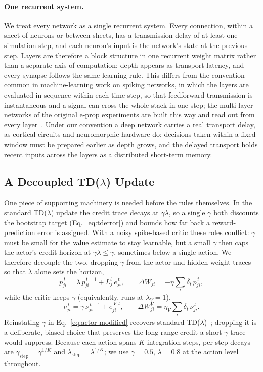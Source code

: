 \documentclass[10pt,twocolumn]{article}
\begin{document}
\paragraph{One recurrent system.} We treat every network as a single recurrent system.
Every connection, within a sheet of neurons or between sheets, has a transmission
delay of at least one simulation step, and each neuron's input is the network's state
at the previous step. Layers are therefore a block structure in one recurrent weight
matrix rather than a separate axis of computation: depth appears as transport latency,
and every synapse follows the same learning rule. This differs from the convention
common in machine-learning work on spiking networks, in which the layers are evaluated
in sequence within each time step, so that feedforward transmission is instantaneous
and a signal can cross the whole stack in one step; the multi-layer networks of the
original e-prop experiments are built this way and read out from every
layer~\citep{eprop2020}. Under our convention a deep network carries a real transport
delay, as cortical circuits and neuromorphic hardware do: decisions taken within a
fixed window must be prepared earlier as depth grows, and the delayed transport holds
recent inputs across the layers as a distributed short-term memory.

\subsection{A Decoupled TD($\lambda$) Update}
\label{sec:tdlambda}

One piece of supporting machinery is needed before the rules themselves. In the
standard TD($\lambda$) update the credit trace decays at $\gamma\lambda$, so a
single $\gamma$ both discounts the bootstrap target (Eq.~\eqref{eq:tderror}) and
bounds how far back a reward-prediction error is assigned. With a noisy
spike-based critic these roles conflict: $\gamma$ must be small for the value
estimate to stay learnable, but a small $\gamma$ then caps the actor's credit horizon at
$\gamma\lambda\le\gamma$, sometimes below a single action. We therefore decouple
the two, dropping $\gamma$ from the actor and hidden-weight traces so that
$\lambda$ alone sets the horizon,
\begin{equation}
p^{\,t}_{ji} = \lambda\, p^{\,t-1}_{ji} + L^t_j\,\bar e^{\,t}_{ji},
\qquad \Delta W_{ji} = -\eta\sum_t \delta_t\, p^{\,t}_{ji},
\label{eq:actor-modified}
\end{equation}
while the critic keeps $\gamma$ (equivalently, runs at $\lambda_V=1$),
\begin{equation}
\nu^{\,t}_{ji} = \gamma\,\nu^{\,t-1}_{ji} + \bar e^{\,V,t}_{ji},
\qquad \Delta W^V_{ji} = \eta_V\sum_t \delta_t\,\nu^{\,t}_{ji}.
\label{eq:critic-modified}
\end{equation}
Reinstating $\gamma$ in Eq.~\eqref{eq:actor-modified} recovers standard
TD($\lambda$)~\citep{SuttonBarto2018}; dropping it is a deliberate, biased choice that preserves the
long-range credit a short $\gamma$ trace would suppress. Because each action
spans $K$ integration steps, per-step decays are
$\gamma_{\mathrm{step}}=\gamma^{1/K}$ and
$\lambda_{\mathrm{step}}=\lambda^{1/K}$; we use $\gamma=0.5$, $\lambda=0.8$
at the action level throughout.
\end{document}
